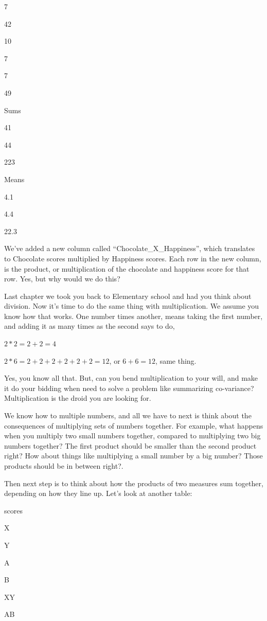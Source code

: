 \documentclass[]{book}
\begin{document}
7

42

10

7

7

49

Sums

41

44

223

Means

4.1

4.4

22.3

We've added a new column called ``Chocolate\_X\_Happiness'', which translates to Chocolate scores multiplied by Happiness scores. Each row in the new column, is the product, or multiplication of the chocolate and happiness score for that row. Yes, but why would we do this?

Last chapter we took you back to Elementary school and had you think about division. Now it's time to do the same thing with multiplication. We assume you know how that works. One number times another, means taking the first number, and adding it as many times as the second says to do,

\(2*2= 2+2=4\)

\(2*6= 2+2+2+2+2+2 = 12\), or \(6+6=12\), same thing.

Yes, you know all that. But, can you bend multiplication to your will, and make it do your bidding when need to solve a problem like summarizing co-variance? Multiplication is the droid you are looking for.

We know how to multiple numbers, and all we have to next is think about the consequences of multiplying sets of numbers together. For example, what happens when you multiply two small numbers together, compared to multiplying two big numbers together? The first product should be smaller than the second product right? How about things like multiplying a small number by a big number? Those products should be in between right?.

Then next step is to think about how the products of two measures sum together, depending on how they line up. Let's look at another table:

scores

X

Y

A

B

XY

AB
\end{document}
